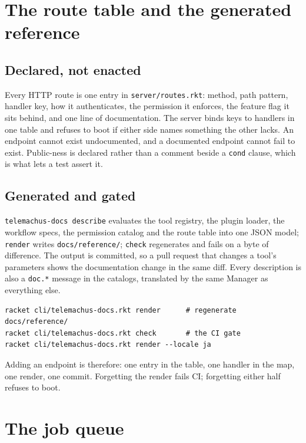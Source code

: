 \documentclass[11pt,a4paper]{report}
\gdef\currentchapterart{art/telemachus-head.png}
\newcommand{\chapterart}[1]{\gdef\currentchapterart{#1}}
\newcommand{\chapterart}[1]{}
\begin{document}
\chapterart{art/ch-12-routes.png}
\chapter{The route table and the generated reference}

\section{Declared, not enacted}

Every HTTP route is one entry in \texttt{server/routes.rkt}: method, path pattern, handler key, how it authenticates, the permission it enforces, the feature flag it sits behind, and one line of documentation. The server binds keys to handlers in one table and refuses to boot if either side names something the other lacks. An endpoint cannot exist undocumented, and a documented endpoint cannot fail to exist. Public-ness is declared rather than a comment beside a \texttt{cond} clause, which is what lets a test assert it.

\section{Generated and gated}

\texttt{telemachus-docs describe} evaluates the tool registry, the plugin loader, the workflow specs, the permission catalog and the route table into one JSON model; \texttt{render} writes \texttt{docs/reference/}; \texttt{check} regenerates and fails on a byte of difference. The output is committed, so a pull request that changes a tool's parameters shows the documentation change in the same diff. Every description is also a \texttt{doc.*} message in the catalogs, translated by the same Manager as everything else.

\begin{lstlisting}
racket cli/telemachus-docs.rkt render      # regenerate docs/reference/
racket cli/telemachus-docs.rkt check       # the CI gate
racket cli/telemachus-docs.rkt render --locale ja
\end{lstlisting}

Adding an endpoint is therefore: one entry in the table, one handler in the map, one render, one commit. Forgetting the render fails CI; forgetting either half refuses to boot.

\chapterart{art/ch-13-queue.png}
\chapter{The job queue}
\end{document}

